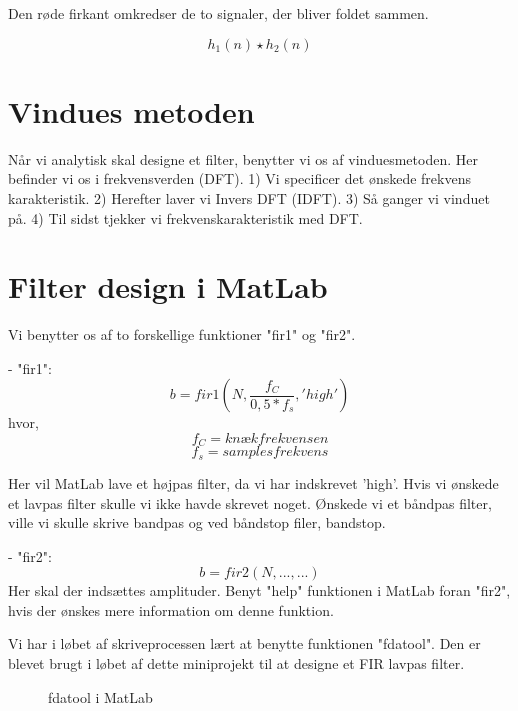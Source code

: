 \documentclass[12pt, letterpaper]{article}
\begin{document}
Den røde firkant omkredser de to signaler, der bliver foldet sammen. 

$$ h_1(n)\star h_2(n) $$


\section{Vindues metoden}
Når vi analytisk skal designe et filter, benytter vi os af vinduesmetoden. Her befinder vi os i frekvensverden (DFT). 
1) Vi specificer det ønskede frekvens karakteristik.
2) Herefter laver vi Invers DFT (IDFT). 
3) Så ganger vi vinduet på. 
4) Til sidst tjekker vi frekvenskarakteristik med DFT. 
 
\section{Filter design i MatLab}
Vi benytter os af to forskellige funktioner "fir1" og "fir2". 

- "fir1": 
$$ b = fir1(N, \frac{f_C}{0,5*f_s}, 'high') $$ 
hvor, 
$$ f_C = knækfrekvensen $$
$$ f_s = samplesfrekvens $$

Her vil MatLab lave et højpas filter, da vi har indskrevet 'high'. 
Hvis vi ønskede et lavpas filter skulle vi ikke havde skrevet noget. Ønskede vi et båndpas filter, ville vi skulle skrive bandpas og ved båndstop filer, bandstop. 

- "fir2": 
$$ b = fir2(N, ..., ...) $$
Her skal der indsættes amplituder. Benyt "help" funktionen i MatLab foran "fir2", hvis der ønskes mere information om denne funktion. 

Vi har i løbet af skriveprocessen lært at benytte funktionen "fdatool". Den er blevet brugt i løbet af dette miniprojekt til at designe et FIR lavpas filter. 

\begin{figure}[!h]
           \begin{floatrow}
             		   			{\caption{fdatool i MatLab}}
           \end{floatrow}
\end{figure}
\end{document}
